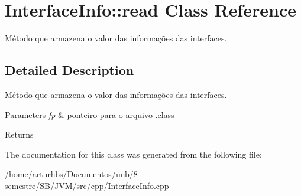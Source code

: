 \hypertarget{classInterfaceInfo_1_1read}{}\section{Interface\+Info\+:\+:read Class Reference}
\label{classInterfaceInfo_1_1read}


Método que armazena o valor das informações das interfaces.  




\subsection{Detailed Description}
Método que armazena o valor das informações das interfaces. 


\begin{DoxyParams}{Parameters}
{\em fp} & ponteiro para o arquivo .class \\
\hline
\end{DoxyParams}
\begin{DoxyReturn}{Returns}

\end{DoxyReturn}


The documentation for this class was generated from the following file\+:\begin{DoxyCompactItemize}
\item 
/home/arturhbs/\+Documentos/unb/8 semestre/\+S\+B/\+J\+V\+M/src/cpp/\hyperlink{InterfaceInfo_8cpp}{Interface\+Info.\+cpp}\end{DoxyCompactItemize}
